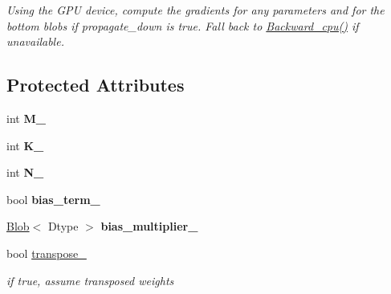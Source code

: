 \begin{DoxyCompactItemize}
\begin{DoxyCompactList}\small\item\em Using the G\+PU device, compute the gradients for any parameters and for the bottom blobs if propagate\+\_\+down is true. Fall back to \hyperlink{classcaffe_1_1InnerProductLayer_a3828d4dd2bfe3257552e5a519deb2104}{Backward\+\_\+cpu()} if unavailable. \end{DoxyCompactList}\end{DoxyCompactItemize}
\subsection*{Protected Attributes}
\begin{DoxyCompactItemize}
\item 
int {\bfseries M\+\_\+}\hypertarget{classcaffe_1_1InnerProductLayer_a7cfcde40b118c74a0e85aa3b58e8aa07}{}\label{classcaffe_1_1InnerProductLayer_a7cfcde40b118c74a0e85aa3b58e8aa07}

\item 
int {\bfseries K\+\_\+}\hypertarget{classcaffe_1_1InnerProductLayer_ad5a55ef3cb96a332977930cfaa700c66}{}\label{classcaffe_1_1InnerProductLayer_ad5a55ef3cb96a332977930cfaa700c66}

\item 
int {\bfseries N\+\_\+}\hypertarget{classcaffe_1_1InnerProductLayer_a863f699772bf8b8d978d6ec8bca42463}{}\label{classcaffe_1_1InnerProductLayer_a863f699772bf8b8d978d6ec8bca42463}

\item 
bool {\bfseries bias\+\_\+term\+\_\+}\hypertarget{classcaffe_1_1InnerProductLayer_a7193d161e30f35b3f6d23293480eb683}{}\label{classcaffe_1_1InnerProductLayer_a7193d161e30f35b3f6d23293480eb683}

\item 
\hyperlink{classcaffe_1_1Blob}{Blob}$<$ Dtype $>$ {\bfseries bias\+\_\+multiplier\+\_\+}\hypertarget{classcaffe_1_1InnerProductLayer_a5b6cf7103085b0460b64e35a0b88a137}{}\label{classcaffe_1_1InnerProductLayer_a5b6cf7103085b0460b64e35a0b88a137}

\item 
bool \hyperlink{classcaffe_1_1InnerProductLayer_a3d881acc0f3bbfb2edb37576592d5c14}{transpose\+\_\+}\hypertarget{classcaffe_1_1InnerProductLayer_a3d881acc0f3bbfb2edb37576592d5c14}{}\label{classcaffe_1_1InnerProductLayer_a3d881acc0f3bbfb2edb37576592d5c14}

\begin{DoxyCompactList}\small\item\em if true, assume transposed weights \end{DoxyCompactList}\end{DoxyCompactItemize}


